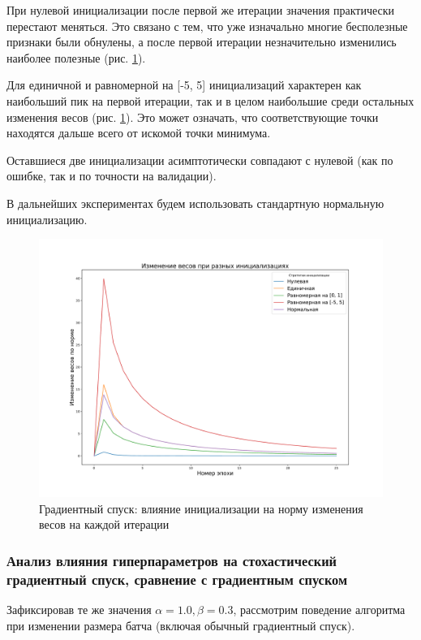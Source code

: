 \documentclass{article}
\begin{document}
                При нулевой инициализации после первой же итерации значения практически перестают меняться. Это связано с тем, что уже изначально многие бесполезные признаки были обнулены, а после первой итерации незначительно изменились наиболее полезные (рис. \ref{fig:7}).

                Для единичной и равномерной на [-5, 5] инициализаций характерен как наибольший пик на первой итерации, так и в целом наибольшие среди остальных изменения весов (рис. \ref{fig:7}). Это может означать, что соответствующие точки находятся дальше всего от искомой точки минимума.

                Оставшиеся две инициализации асимптотически совпадают с нулевой (как по ошибке, так и по точности на валидации).

                В дальнейших экспериментах будем использовать стандартную нормальную инициализацию.
                \begin{figure}[H]
                    \centering
                    \includegraphics[width=0.8\linewidth]{./pictures/GDw0_w_diff.pdf}
                    \caption{Градиентный спуск: влияние инициализации на норму изменения весов на каждой итерации}
                    \label{fig:7}
                \end{figure}
            \subsubsection{Анализ влияния гиперпараметров на стохастический градиентный спуск, сравнение с градиентным спуском}
                Зафиксировав те же значения $\alpha = 1.0, \beta = 0.3$, рассмотрим поведение алгоритма при изменении размера батча (включая обычный градиентный спуск).
                
\end{document}
